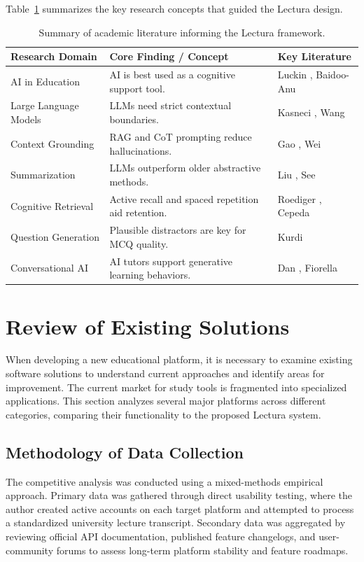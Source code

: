Table~\ref{tab:lit_summary} summarizes the key research concepts that guided the Lectura design.

\begin{table}[htbp]
\centering
\begin{tabular}{|l|p{5.5cm}|l|}
\hline
\textbf{Research Domain} & \textbf{Core Finding / Concept} & \textbf{Key Literature} \\ \hline
AI in Education & AI is best used as a cognitive support tool. & Luckin \cite{luckin2016intelligence}, Baidoo-Anu \cite{baidoo2023education} \\ \hline
Large Language Models & LLMs need strict contextual boundaries. & Kasneci \cite{kasneci2023chatgpt}, Wang \cite{wang2024large} \\ \hline
Context Grounding & RAG and CoT prompting reduce hallucinations. & Gao \cite{gao2023retrieval}, Wei \cite{wei2022chain} \\ \hline
Summarization & LLMs outperform older abstractive methods. & Liu \cite{liu2023summary}, See \cite{see2017get} \\ \hline
Cognitive Retrieval & Active recall and spaced repetition aid retention. & Roediger \cite{roediger2006test}, Cepeda \cite{cepeda2006distributed} \\ \hline
Question Generation & Plausible distractors are key for MCQ quality. & Kurdi \cite{kurdi2020systematic} \\ \hline
Conversational AI & AI tutors support generative learning behaviors. & Dan \cite{dan2023educhat}, Fiorella \cite{fiorella2015learning} \\ \hline
\end{tabular}
\vspace{6pt}
\caption{Summary of academic literature informing the Lectura framework.}
\label{tab:lit_summary}
\end{table}

\section{Review of Existing Solutions}
When developing a new educational platform, it is necessary to examine existing software solutions to understand current approaches and identify areas for improvement. The current market for study tools is fragmented into specialized applications. This section analyzes several major platforms across different categories, comparing their functionality to the proposed Lectura system.

\subsection{Methodology of Data Collection}
The competitive analysis was conducted using a mixed-methods empirical approach. Primary data was gathered through direct usability testing, where the author created active accounts on each target platform and attempted to process a standardized university lecture transcript. Secondary data was aggregated by reviewing official API documentation, published feature changelogs, and user-community forums to assess long-term platform stability and feature roadmaps. 

